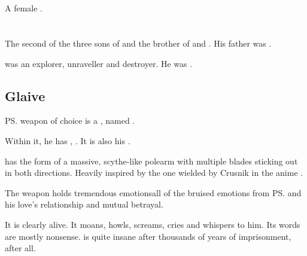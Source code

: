 \section[Laccashyth]{\Laccashyth}
A female \dragon. 















\section{\QuessanthIshnaruchaefir}
\index{\Ishnaruchaefir}
\index{\QuessanthIshnaruchaefir}
The second of the three sons of \Tiamat and the brother of \Nexagglachel{} and \Secherdamon.
His father was \Iurzmacul. 

\Ishnaruchaefir{} was an explorer, unraveller and destroyer. 
He was . 









\subsection{Glaive} 
\ps{\Ishnaruchaefir} weapon of choice is a , named \Triestessakhin.

Within it, he has , \Triestessakhin{}. 
It is also his . 

\Triestessakhin{} has the form of a massive, scythe-like polearm with multiple blades sticking out in both directions. 
Heavily inspired by the one wielded by Crusnik in the anime \cite{Anime:TrinityBlood}.

The weapon holds tremendous emotions\dash all of the bruised emotions from \ps{\Ishnaruchaefir} and his love's relationship and mutual betrayal. 

It is clearly alive. 
It moans, howls, screams, cries and whispers to him. 
Its words are mostly nonsense. 
\Triestessakhin{} is quite insane after thousands of years of imprisonment, after all. 

